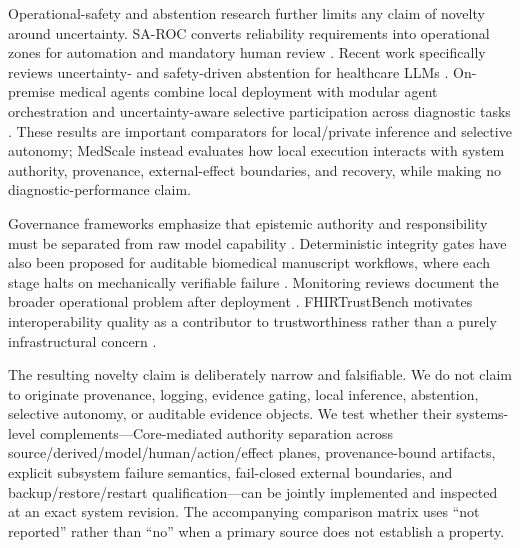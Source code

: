 Operational-safety and abstention research further limits any claim of novelty around uncertainty. SA-ROC converts reliability requirements into operational zones for automation and mandatory human review \citep{Kim.2026}. Recent work specifically reviews uncertainty- and safety-driven abstention for healthcare LLMs \citep{Presacan.2026}. On-premise medical agents combine local deployment with modular agent orchestration and uncertainty-aware selective participation across diagnostic tasks \citep{Zhang.2026}. These results are important comparators for local/private inference and selective autonomy; MedScale instead evaluates how local execution interacts with system authority, provenance, external-effect boundaries, and recovery, while making no diagnostic-performance claim.

Governance frameworks emphasize that epistemic authority and responsibility must be separated from raw model capability \citep{Akgun.2026,Cao.2026}. Deterministic integrity gates have also been proposed for auditable biomedical manuscript workflows, where each stage halts on mechanically verifiable failure \citep{Nam.2026}. Monitoring reviews document the broader operational problem after deployment \citep{Andersen.2024}. FHIRTrustBench motivates interoperability quality as a contributor to trustworthiness rather than a purely infrastructural concern \citep{Bukhari.2026}.

The resulting novelty claim is deliberately narrow and falsifiable. We do not claim to originate provenance, logging, evidence gating, local inference, abstention, selective autonomy, or auditable evidence objects. We test whether their systems-level complements---Core-mediated authority separation across source/derived/model/human/action/effect planes, provenance-bound artifacts, explicit subsystem failure semantics, fail-closed external boundaries, and backup/restore/restart qualification---can be jointly implemented and inspected at an exact system revision. The accompanying comparison matrix uses ``not reported'' rather than ``no'' when a primary source does not establish a property.
